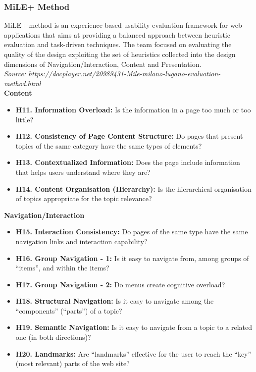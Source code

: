 \subsubsection{MiLE+ Method}
MiLE+ method is an experience-based usability evaluation framework for web applications that aims at providing a balanced approach between heuristic evaluation and task-driven techniques. The team focused on evaluating the quality of the design exploiting the set of heuristics collected into the design dimensions of Navigation/Interaction, Content and Presentation.\\
\textit{Source: https://docplayer.net/20989431-Mile-milano-lugano-evaluation-method.html}\\

\textbf{Content}
\begin{itemize}
    \item \textbf{H11. Information Overload:} Is the information in a page too much or too little?
    \item \textbf{H12. Consistency of Page Content Structure:} Do pages that present topics of the same category have the same types of elements?
    \item \textbf{H13. Contextualized Information:} Does the page include information that helps users understand where they are?
    \item \textbf{H14. Content Organisation (Hierarchy):} Is the hierarchical organisation of topics appropriate for the topic relevance?
\end{itemize}

\textbf{Navigation/Interaction}
\begin{itemize}
    \item \textbf{H15.  Interaction Consistency:} Do pages of the same type have the same navigation links and interaction capability?
    \item \textbf{H16.  Group Navigation - 1:} Is it easy to navigate from, among groups of “items”, and within the items?
    \item \textbf{H17.  Group Navigation - 2:} Do menus create cognitive overload?
    \item \textbf{H18.  Structural Navigation:} Is it easy to navigate among the “components” (“parts”) of a topic?
    \item \textbf{H19.  Semantic Navigation:} Is it easy to navigate from a topic to a related one (in both directions)?
    \item \textbf{H20.  Landmarks:} Are “landmarks” effective for the user to reach the “key” (most relevant) parts of the web site?
\end{itemize}


